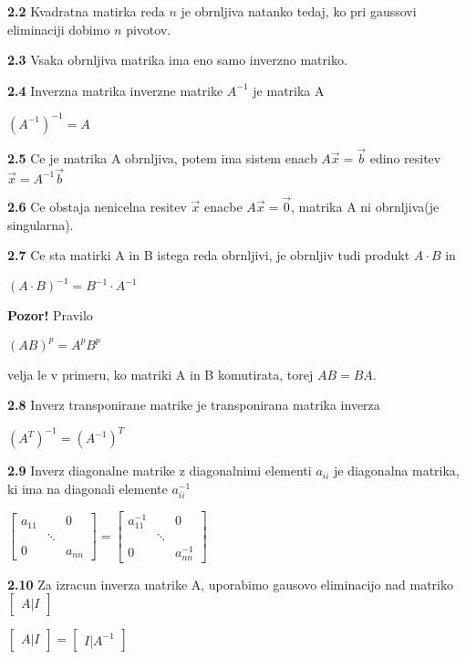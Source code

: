 \documentclass{article}
\begin{document}
\begin{multicols}{3}
\textbf{2.2} Kvadratna matirka reda $n$ je obrnljiva natanko tedaj, ko pri
gaussovi eliminaciji dobimo $n$ pivotov.

\textbf{2.3} Vsaka obrnljiva matrika ima eno samo inverzno matriko.

\textbf{2.4} Inverzna matrika inverzne matrike $A^{-1}$ je matrika A
\begin{center}
    $(A^{-1})^{-1} = A$
\end{center}

\textbf{2.5} Ce je matrika A obrnljiva, potem ima sistem enacb
$A\vec{x} = \vec{b}$ edino resitev $\vec{x} = A^{-1} \vec{b}$

\textbf{2.6} Ce obstaja nenicelna resitev $\vec{x}$ enacbe $A\vec{x} = \vec{0}$,
matrika A ni obrnljiva(je singularna).

\textbf{2.7} Ce sta matirki A in B istega reda obrnljivi, je obrnljiv tudi
produkt $A \cdot B$ in
\begin{center}
    $(A \cdot B)^{-1} =
    B^{-1} \cdot A^{-1}
    $
\end{center}

\textbf{Pozor!} Pravilo
\begin{center}
    $(AB)^{p} = A^{p}B^{p}$
\end{center}
velja le v primeru, ko matriki A in B komutirata, torej $AB = BA$.

\textbf{2.8} Inverz transponirane matrike je transponirana matrika inverza
\begin{center}
    $(A^{T})^{-1} = (A^{-1})^{T}$
\end{center}

\textbf{2.9} Inverz diagonalne matrike z diagonalnimi elementi $a_{ii}$ je
diagonalna matrika, ki ima na diagonali elemente $a_{ii}^{-1}$
\begin{center}
    $\begin{bmatrix}
        a_{11} &        & 0\\
               & \ddots &\\
        0      &        & a_{nn}
    \end{bmatrix}=
    \begin{bmatrix}
        a_{11}^{-1} &        & 0\\
                    & \ddots &\\
        0           &        & a_{nn}^{-1}
    \end{bmatrix}
    $
\end{center}

\textbf{2.10} Za izracun inverza matrike A, uporabimo gausovo eliminacijo nad
matriko $\begin{bmatrix}A|I\end{bmatrix}$
\begin{center}
    $\begin{bmatrix}A|I\end{bmatrix} =
    \begin{bmatrix}I|A^{-1}\end{bmatrix}
    $
\end{center}


\end{multicols}
\end{document}
